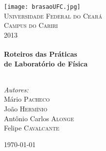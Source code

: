 
\begin{titlepage}

\begin{center}


\texttt{[image: brasaoUFC.jpg]}\\[1cm]    

\textsc{\LARGE Universidade Federal do Ceará}\\[0.5cm]

\textsc{\LARGE Campus do Cariri}\\[1.5cm]

\textsc{\Large 2013}\\[0.5cm]


\HRule \\[0.4cm]
{ \huge \bfseries Roteiros das Práticas \\[0.2cm] de Laboratório de Física}\\[0.4cm]

\HRule \\[1.5cm]

\begin{minipage}{0.4\textwidth}
\begin{flushleft} \large
\emph{Autores:}\\
Mário \textsc{Pacheco}\\
João \textsc{Hermínio}\\
Antônio Carlos \textsc{Alonge}\\
Felipe \textsc{Cavalcante}

\end{flushleft}
\end{minipage}
\begin{minipage}{0.4\textwidth}
\begin{flushright} \large
\end{flushright}
\end{minipage}

\vfill

{\large \today}

\end{center}

\end{titlepage}

